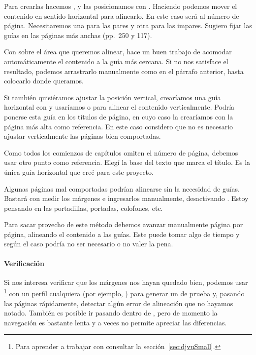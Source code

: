 \documentclass[%
	a5paper,
	10pt,
	twoside,
	openright,
	final,
]{memoir}
\begin{document}
{	Para crearlas hacemos , y las posicionamos con . Haciendo  podemos mover el contenido en sentido horizontal para alinearlo. En este caso será al número de página. Necesitaremos una para las pares y otra para las impares. Sugiero fijar las guías en las páginas más anchas (pp.~250 y 117).

	Con \keys{\shift + \,\leftclick\,\leftclick} sobre el área que queremos alinear, \scantailor hace un buen trabajo de acomodar automáticamente el contenido a la guía más cercana. Si no nos satisface el resultado, podemos arrastrarlo manualmente como en el párrafo anterior, hasta colocarlo donde queramos.

	Si también quisiéramos ajustar la posición vertical, crearíamos una guía horizontal con  y usaríamos \keys{\ctrl + \leftclick\!\!\!\leftclick} o  para alinear el contenido verticalmente. Podría ponerse esta guía en los títulos de página, en cuyo caso la crearíamos con la página más alta como referencia. En este caso considero que no es necesario ajustar verticalmente las páginas bien comportadas.

	Como todos los comienzos de capítulos omiten el número de página, debemos usar otro punto como referencia. Elegí la base del texto que marca el título. Es la única guía horizontal que creé para este proyecto.

	Algunas páginas mal comportadas podrían alinearse sin la necesidad de guías. Bastará con medir los márgenes e ingresarlos manualmente, desactivando . Estoy pensando en las portadillas, portadas, colofones, etc.

	Para sacar provecho de este método debemos avanzar manualmente página por página, alineando el contenido a las guías. Este puede tomar algo de tiempo y según el caso podría no ser necesario o no valer la pena.

	\paragraph{Verificación} Si nos interesa verificar que los márgenes nos hayan quedado bien, podemos usar \djvusmall\footnote{Para aprender a trabajar con \djvusmall consultar la sección~\ref{sec:djvuSmall}.} con un perfil cualquiera (por ejemplo, ) para generar un \djvu de prueba y, pasando las páginas rápidamente, detectar algún error de alineación que no hayamos notado. También es posible ir pasando dentro de \scantailor, pero de momento la navegación es bastante lenta y a veces no permite apreciar las diferencias.

}
\end{document}
